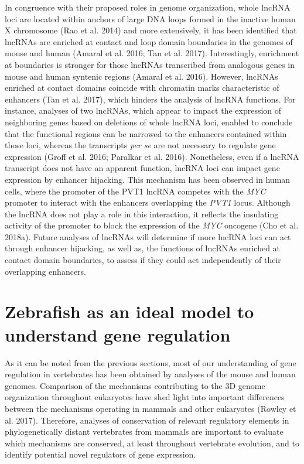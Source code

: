 In congruence with their proposed roles in genome organization, whole lncRNA loci are located within anchors of large DNA loops formed in the inactive human X chromosome (Rao et al. 2014) and more extensively, it has been identified that lncRNAs are enriched at contact and loop domain boundaries in the genomes of mouse and human (Amaral et al. 2016; Tan et al. 2017). Interestingly, enrichment at boundaries is stronger for those lncRNAs transcribed from analogous genes in mouse and human syntenic regions (Amaral et al. 2016). However, lncRNAs enriched at contact domains coincide with chromatin marks characteristic of enhancers (Tan et al. 2017), which hinders the analysis of lncRNA functions. For instance, analyses of two lncRNAs, which appear to impact the expression of neighboring genes based on deletions of whole lncRNA loci, enabled to conclude that the functional regions can be narrowed to the enhancers contained within those loci, whereas the transcripts \textit{per se} are not necessary to regulate gene expression (Groff et al. 2016; Paralkar et al. 2016). Nonetheless, even if a lncRNA transcript does not have an apparent function, lncRNA loci can impact gene expression by enhancer hijacking. This mechanism has been observed in human cells, where the promoter of the PVT1 lncRNA competes with the \textit{MYC} promoter to interact with the enhancers overlapping the \textit{PVT1} locus. Although the lncRNA does not play a role in this interaction, it reflects the insulating activity of the promoter to block the expression of the \textit{MYC} oncogene (Cho et al. 2018a). Future analyses of lncRNAs will determine if more lncRNA loci can act through enhancer hijacking, as well as, the functions of lncRNAs enriched at contact domain boundaries, to assess if they could act independently of their overlapping enhancers.\\

	\section{Zebrafish as an ideal model to understand gene regulation}

As it can be noted from the previous sections, most of our understanding of gene regulation in vertebrates has been obtained by analyses of the mouse and human genomes. Comparison of the mechanisms contributing to the 3D genome organization throughout eukaryotes have shed light into important differences between the mechanisms operating in mammals and other eukaryotes (Rowley et al. 2017). Therefore, analyses of conservation of relevant regulatory elements in phylogenetically distant vertebrates from mammals are important to evaluate which mechanisms are conserved, at least throughout vertebrate evolution, and to identify potential novel regulators of gene expression.\\

